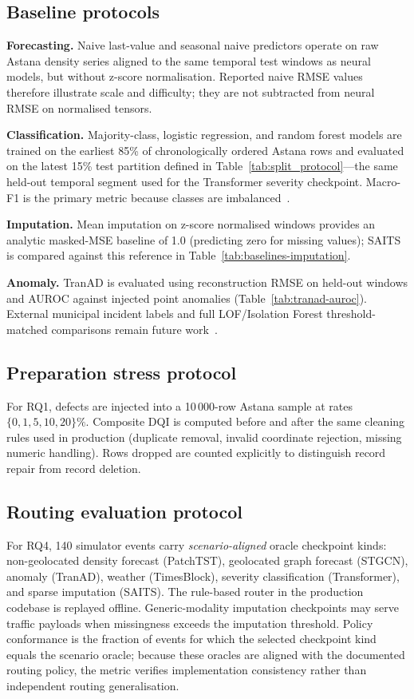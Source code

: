 \subsection{Baseline protocols}

\textbf{Forecasting.} Naive last-value and seasonal naive predictors operate on raw Astana density series aligned to the same temporal test windows as neural models, but without z-score normalisation. Reported naive RMSE values therefore illustrate scale and difficulty; they are not subtracted from neural RMSE on normalised tensors.

\textbf{Classification.} Majority-class, logistic regression, and random forest models are trained on the earliest 85\% of chronologically ordered Astana rows and evaluated on the latest 15\% test partition defined in Table~\ref{tab:split_protocol}---the same held-out temporal segment used for the Transformer severity checkpoint. Macro-F1 is the primary metric because classes are imbalanced~\cite{breiman2001random}.

\textbf{Imputation.} Mean imputation on z-score normalised windows provides an analytic masked-MSE baseline of 1.0 (predicting zero for missing values); SAITS is compared against this reference in Table~\ref{tab:baselines-imputation}.

\textbf{Anomaly.} TranAD is evaluated using reconstruction RMSE on held-out windows and AUROC against injected point anomalies (Table~\ref{tab:tranad-auroc}). External municipal incident labels and full LOF/Isolation Forest threshold-matched comparisons remain future work~\cite{breunig2000lof,liu2008isolation,pang2021deep}.

\subsection{Preparation stress protocol}

For RQ1, defects are injected into a 10\,000-row Astana sample at rates $\{0,1,5,10,20\}\%$. Composite DQI is computed before and after the same cleaning rules used in production (duplicate removal, invalid coordinate rejection, missing numeric handling). Rows dropped are counted explicitly to distinguish record repair from record deletion.

\subsection{Routing evaluation protocol}

For RQ4, 140 simulator events carry \emph{scenario-aligned} oracle checkpoint kinds: non-geolocated density forecast (PatchTST), geolocated graph forecast (STGCN), anomaly (TranAD), weather (TimesBlock), severity classification (Transformer), and sparse imputation (SAITS). The rule-based router in the production codebase is replayed offline. Generic-modality imputation checkpoints may serve traffic payloads when missingness exceeds the imputation threshold. Policy conformance is the fraction of events for which the selected checkpoint kind equals the scenario oracle; because these oracles are aligned with the documented routing policy, the metric verifies implementation consistency rather than independent routing generalisation.


